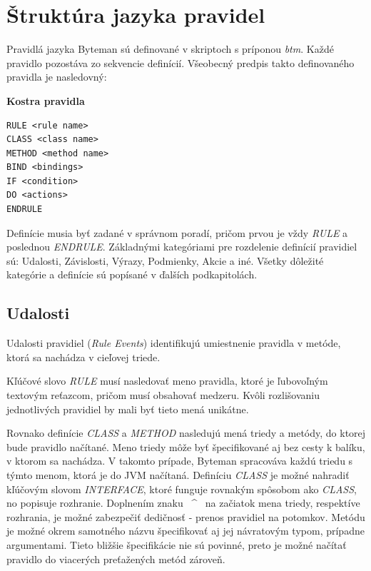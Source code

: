 \documentclass[11pt,final,oneside]{fithesis}
\newenvironment{example}[1]
{
\vspace{3mm}
\noindent\textbf{#1}
\vspace{2mm}
}
{
\vspace{3mm}
}
\begin{document}
\section{Štruktúra jazyka pravidel}
Pravidlá jazyka Byteman sú definované v skriptoch s príponou \textit{btm}.
Každé pravidlo pozostáva zo sekvencie definícií. Všeobecný predpis takto
definovaného pravidla je nasledovný:

\begin{example}{Kostra pravidla}
\begin{verbatim}
RULE <rule name>
CLASS <class name>
METHOD <method name>
BIND <bindings>
IF <condition>
DO <actions>
ENDRULE
\end{verbatim}
\end{example}

Definície musia byť zadané v správnom poradí, pričom prvou je vždy
\textit{RULE} a poslednou \textit{ENDRULE}. Základnými kategóriami pre
rozdelenie definícií pravidiel sú: Udalosti, Závislosti, Výrazy, Podmienky,
Akcie a iné. Všetky dôležité kategórie a definície sú popísané v ďalších
podkapitolách.

\subsection{Udalosti}
Udalosti pravidiel (\textit{Rule Events}) identifikujú umiestnenie pravidla v
metóde, ktorá sa nachádza v cieľovej triede.

Kľúčové slovo \textit{RULE} musí nasledovať meno pravidla, ktoré je ľubovoľným 
textovým reťazcom, pričom musí obsahovať medzeru. Kvôli rozlišovaniu 
jednotlivých pravidiel by mali byť tieto mená unikátne.

Rovnako definície \textit{CLASS} a \textit{METHOD} nasledujú mená triedy a 
metódy, do ktorej bude pravidlo načítané. Meno triedy môže byť špecifikované aj
bez cesty k balíku, v ktorom sa nachádza. V takomto prípade, Byteman 
spracováva každú triedu s týmto menom, ktorá je do JVM načítaná. Definíciu 
\textit{CLASS} je možné nahradiť kľúčovým slovom
\textit{INTERFACE}, ktoré funguje rovnakým spôsobom ako \textit{CLASS}, no 
popisuje rozhranie. Doplnením znaku ~\^~ na začiatok mena triedy, respektíve 
rozhrania, je možné zabezpečiť dedičnosť - prenos pravidiel na potomkov.
Metódu je možné okrem samotného názvu špecifikovať aj jej návratovým typom, 
prípadne argumentami. Tieto bližšie špecifikácie nie sú povinné, preto je 
možné načítať pravidlo do viacerých preťažených metód zároveň.
\end{document}
